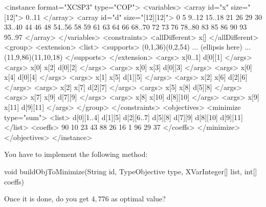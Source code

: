 \documentclass[10pt]{article}
\newenvironment{boxabsc}
               {\medskip \begin{bclogo}[barre=none,arrondi=0.2,logo=]{}\vspace{-0.6cm}}
               {\vspace{-0.1cm}\end{bclogo} \smallskip}
\begin{document}
\begin{boxabsc}
\begin{absc}
<instance format="XCSP3" type="COP">
  <variables>
    <array id="x" size="[12]"> 0..11 </array>
    <array id="d" size="[12][12]"> 0 5 9..12 15..18 21 26 29 30 33..40 44 46 48 54..56 58 59 61 63 64 66 68..70 72 73 76 78..80 83 85 86 90 93 95..97 </array>
  </variables>
  <constraints>
    <allDifferent> x[] </allDifferent>
    <group>
      <extension>
        <list> %
        <supports> (0,1,36)(0,2,54) ... (ellipsis here) ... (11,9,86)(11,10,18) </supports>
      </extension>
      <args> x[0..1] d[0][1] </args>
      <args> x[0] x[2] d[0][2] </args>
      <args> x[0] x[3] d[0][3] </args>
      <args> x[0] x[4] d[0][4] </args>
      <args> x[1] x[5] d[1][5] </args>
      <args> x[2] x[6] d[2][6] </args>
      <args> x[2] x[7] d[2][7] </args>
      <args> x[5] x[8] d[5][8] </args>
      <args> x[7] x[9] d[7][9] </args>
      <args> x[8] x[10] d[8][10] </args>
      <args> x[9] x[11] d[9][11] </args>
    </group>
  </constraints>
  <objectives>
    <minimize type="sum">
      <list> d[0][1..4] d[1][5] d[2][6..7] d[5][8] d[7][9] d[8][10] d[9][11] </list>
      <coeffs> 90 10 23 43 88 26 16 1 96 29 37 </coeffs>
    </minimize>
  </objectives>
</instance>
\end{absc} 
\end{boxabsc}

You have to implement the following method:

\begin{boxabsc}
\begin{absc}
void buildObjToMinimize(String id, TypeObjective type, XVarInteger[] list, int[] coeffs) 
\end{absc} 
\end{boxabsc}

Once it is done, do you get $4,776$ as optimal value?
\end{document}
